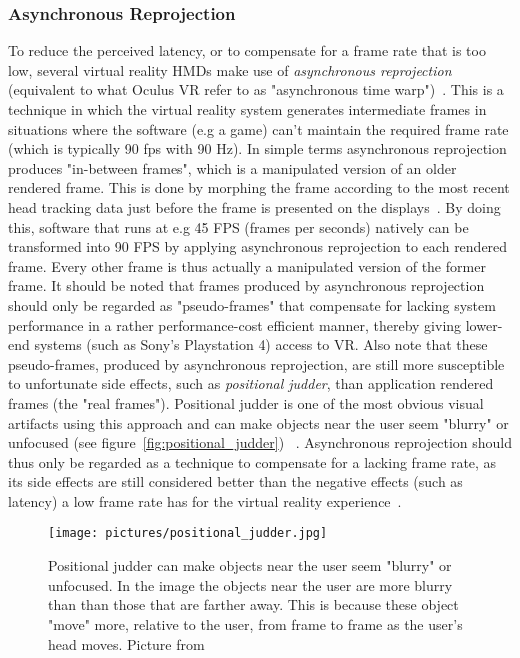 \subsubsection{Asynchronous Reprojection}
To reduce the perceived latency, or to compensate for a frame rate that is too low, several virtual reality HMDs make use of \textit{asynchronous reprojection}
(equivalent to what Oculus VR refer to as "asynchronous time warp")~\citep{GD2016}. This is a technique in which the virtual reality system generates intermediate frames 
in situations where the software (e.g a game) can't maintain the required frame rate (which is typically 90 fps with 90 Hz). In simple terms asynchronous reprojection 
produces "in-between frames", which is a manipulated version of an older rendered frame. This is done by morphing the frame according to the most recent head tracking data just 
before the frame is presented on the displays~\citep{GD2016}. By doing this, software that runs at e.g 45 FPS (frames per seconds) natively can be transformed into 90 FPS by 
applying asynchronous reprojection to each rendered frame. Every other frame is thus actually a manipulated version of the former frame. It should be noted that frames produced by
asynchronous reprojection should only be regarded as "pseudo-frames" that compensate for lacking system performance in a rather performance-cost efficient manner, thereby
giving lower-end systems (such as Sony's Playstation 4) access to VR. Also note that these pseudo-frames, produced by asynchronous reprojection, are still 
more susceptible to unfortunate side effects, such as \textit{positional judder}, than application rendered frames (the "real frames"). Positional judder is
one of the most obvious visual artifacts using this approach and can make objects near the user seem "blurry" or unfocused (see figure~\vref{fig:positional_judder})
~\citep{Antonov2015}. Asynchronous reprojection should thus only be regarded as a technique to compensate for a lacking frame rate, as its side effects are 
still considered better than the negative effects (such as latency) a low frame rate has for the virtual reality experience~\citep{OCULUS2016}. 

\begin{figure}%
	\label{fig:positional_judder}
	\texttt{[image: pictures/positional\_judder.jpg]}
	\caption[Positional judder can make objects near the user seem "blurry" or unfocused]
	{Positional judder can make objects near the user seem "blurry" or unfocused. In the image the objects near the user are more blurry than 
	than those that are farther away. This is because these object "move" more, relative to the user, from frame to frame as the user's head moves. 
	Picture from~\citet{Antonov2015}}
\end{figure} 


